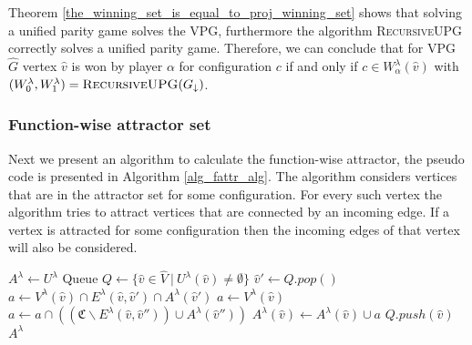 Theorem \ref{the_winning_set_is_equal_to_proj_winning_set} shows that solving a unified parity game solves the VPG, furthermore the algorithm \textsc{RecursiveUPG} correctly solves a unified parity game. Therefore, we can conclude that for VPG $\hat{G}$ vertex $\hat{v}$ is won by player $\alpha$ for configuration $c$ if and only if $c \in W_\alpha^\lambda(\hat{v})$ with $(W^\lambda_0,W^\lambda_1) = \textsc{RecursiveUPG}(G_{\downarrow})$.

\subsubsection{Function-wise attractor set}
Next we present an algorithm to calculate the function-wise attractor, the pseudo code is presented in Algorithm \ref{alg_fattr_alg}. The algorithm considers vertices that are in the attractor set for some configuration. For every such vertex the algorithm tries to attract vertices that are connected by an incoming edge. If a vertex is attracted for some configuration then the incoming edges of that vertex will also be considered.
\begin{algorithm}
	\caption{$\textsc{$\alpha$-FAttractor}(G, U^\lambda : \hat{V} \rightarrow 2^\mathfrak{C})$}\label{alg_fattr_alg}
	\begin{algorithmic}[1]
		\State $A^\lambda \gets U^\lambda$
		\State Queue $Q \gets \{\hat{v} \in \hat{V} \ |\ U^\lambda(\hat{v}) \neq \emptyset  \}$
		\label{line:fattr:while}
		\State $\hat{v}' \gets Q.pop()$\label{line:fattr:pop}
		\label{line:fattr:firstfor}
			\label{line:fattr:if_owner_alpha}
				\State $a \gets V^\lambda(\hat{v}) \cap E^\lambda(\hat{v},\hat{v}') \cap A^\lambda(\hat{v}')$\label{line:fattr:attract_owner_alpha}
			\Else
				\State $a \gets V^\lambda(\hat{v})$\label{line:fattr:attract_owner_not_alpha_start}
					\State $a \gets a \cap ((\mathfrak{C}\backslash E^\lambda(\hat{v},\hat{v}'')) \cup A^\lambda(\hat{v}''))$
				\EndFor\label{line:fattr:attract_owner_not_alpha_end}
			\EndIf\label{line:fattr:if_owner_alpha_end}
			\label{line:fattr:if_something_attracted}
				\State $A^\lambda(\hat{v}) \gets A^\lambda(\hat{v}) \cup a$\label{line:fattr:add_to_A}
				\State $Q.push(\hat{v})$\label{line:fattr:add_to_Q}
			\EndIf
		\EndFor\label{line:fattr:while_iter_end}
		\EndWhile
		\State \Return $A^\lambda$
	\end{algorithmic}
\end{algorithm}

